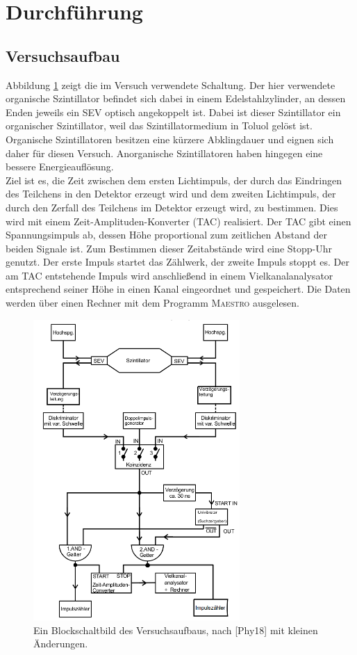 \documentclass[
  bibliography=totoc,     %
  captions=tableheading,  %
  titlepage=firstiscover, %
]{scrartcl}
\begin{document}
\section{Durchführung}
  \subsection{Versuchsaufbau}
  \label{sec:Aufbau}
  	Abbildung \ref{fig:aufbau} zeigt die im Versuch verwendete Schaltung.
  	Der hier verwendete organische Szintillator befindet sich dabei in einem
    Edelstahlzylinder, an dessen Enden jeweils ein SEV optisch angekoppelt ist.
    Dabei ist dieser Szintillator ein organischer Szintillator, weil das
    Szintillatormedium in Toluol gelöst ist. Organische Szintillatoren besitzen
    eine kürzere Abklingdauer und eignen sich daher für diesen Versuch. Anorganische
    Szintillatoren haben hingegen eine bessere Energieauflösung.\\
  	Ziel ist es, die Zeit zwischen dem ersten Lichtimpuls, der durch das
    Eindringen des Teilchens in den Detektor erzeugt wird und dem zweiten
    Lichtimpuls, der durch den Zerfall des Teilchens im Detektor erzeugt wird,
    zu bestimmen. Dies wird mit einem Zeit-Amplituden-Konverter (TAC) realisiert.
    Der TAC gibt einen Spannungsimpuls ab, dessen Höhe proportional zum zeitlichen Abstand der
  	beiden Signale ist. Zum Bestimmen dieser Zeitabstände wird eine Stopp-Uhr genutzt.
    Der erste Impuls startet das Zählwerk, der zweite Impuls stoppt es.
    Der am TAC entstehende Impuls wird anschließend in einem Vielkanalanalysator
  	entsprechend seiner Höhe in einen Kanal eingeordnet und gespeichert.
  	Die Daten werden über einen Rechner mit dem Programm \textsc{Maestro} ausgelesen.
    \newpage
  	\begin{figure}[H]
    	\centering
    	\includegraphics[width=0.7\textwidth]{Bilder/AufbauB.png}
    	\caption{Ein Blockschaltbild des Versuchsaufbaus, nach [Phy18] mit kleinen Änderungen.}
    	\label{fig:aufbau}
  	\end{figure}
\end{document}
